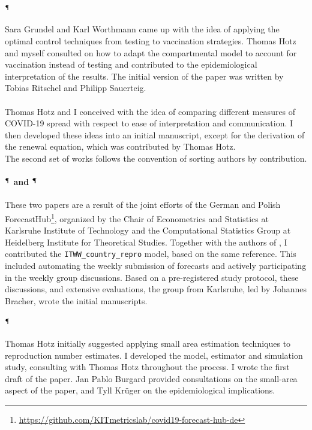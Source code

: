 \begin{refsection}
\paragraph{\cite{Grundel2021How}$^{\mathparagraph}$}
Sara Grundel and Karl Worthmann came up with the idea of applying the optimal control techniques from testing to vaccination strategies. Thomas Hotz and myself consulted on how to adapt the compartmental model to account for vaccination instead of testing and contributed to the epidemiological interpretation of the results. The initial version of the paper was written by Tobias Ritschel and Philipp Sauerteig.

\paragraph{\cite{Heyder2023Measures}}
Thomas Hotz and I conceived with the idea of comparing different measures of COVID-19 spread with respect to ease of interpretation and communication. I then developed these ideas into an initial manuscript, except for the derivation of the renewal equation, which was contributed by Thomas Hotz. \\[18pt]

The second set of works follows the convention of sorting authors by contribution.

\paragraph{\cite{Bracher2021Preregistered}$^\mathparagraph$ and \cite{Bracher2022National}$^\mathparagraph$}
These two papers are a result of the joint efforts of the German and Polish ForecastHub\footnote{\url{https://github.com/KITmetricslab/covid19-forecast-hub-de}}, organized by the Chair of Econometrics and Statistics at Karlsruhe Institute of Technology and the Computational Statistics Group at Heidelberg Institute for Theoretical Studies. Together with the authors of \citep{Burgard2021Regional}, I contributed the \texttt{ITWW\_country\_repro} model, based on the same reference. This included automating the weekly submission of forecasts and actively participating in the weekly group discussions. Based on a pre-registered study protocol, these discussions, and extensive evaluations, the group from Karlsruhe, led by Johannes Bracher, wrote the initial manuscripts.

\paragraph{\cite{Heyder2022Regional}$^{\mathparagraph}$}
Thomas Hotz initially suggested applying small area estimation techniques to reproduction number estimates. I developed the model, estimator and simulation study, consulting with Thomas Hotz throughout the process. I wrote the first draft of the paper. Jan Pablo Burgard provided consultations on the small-area aspect of the paper, and Tyll Krüger on the epidemiological implications.


\end{refsection}
